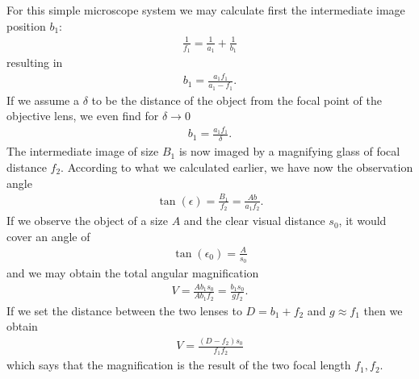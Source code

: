 \documentclass[letterpaper,10pt,english]{sphinxmanual}
\begin{document}
For this simple microscope system we may calculate first the intermediate image position \(b_1\):
\begin{equation*}
\begin{split}\frac{1}{f_1}=\frac{1}{a_1}+\frac{1}{b_1}\end{split}
\end{equation*}
resulting in
\begin{equation*}
\begin{split}b_1=\frac{a_1 f_1}{a_1-f_1}.\end{split}
\end{equation*}
If we assume a \(\delta\) to be the distance of the object from the focal point of the objective lens, we even find for \(\delta \rightarrow 0\)
\begin{equation*}
\begin{split}b_1=\frac{a_1 f_1}{\delta}.\end{split}
\end{equation*}
The intermediate image of size \(B_1\) is now imaged by a magnifying glass of focal distance \(f_2\). According to what we calculated earlier, we have now the observation angle
\begin{equation*}
\begin{split}\tan(\epsilon)=\frac{B_1}{f_2}=\frac{Ab}{a_1 f_2}.\end{split}
\end{equation*}
If we observe the object of a size \(A\) and the clear visual distance \(s_0\), it would cover an angle of
\begin{equation*}
\begin{split}\tan(\epsilon_0)=\frac{A}{s_0}\end{split}
\end{equation*}
and we may obtain the total angular magnification
\begin{equation*}
\begin{split}V=\frac{A b_1 s_0}{A b_1 f_2}=\frac{b_1 s_0}{g f_2}.\end{split}
\end{equation*}
If we set the distance between the two lenses to \(D=b_1+f_2\) and \(g\approx f_1\) then we obtain
\begin{equation*}
\begin{split}V=\frac{(D-f_2)s_0}{f_1 f_2}\end{split}
\end{equation*}
which says that the magnification is the result of the two focal length \(f_1,f_2\).
\end{document}

